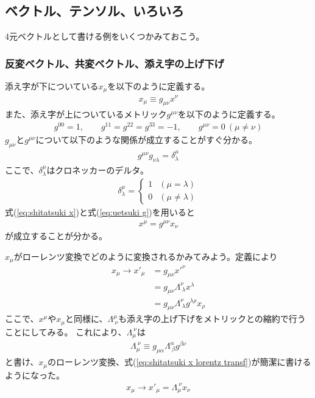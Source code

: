 \documentclass[10pt,a4paper]{jarticle}
\begin{document}
\subsection{ベクトル、テンソル、いろいろ}
4元ベクトルとして書ける例をいくつかみておこう。

\subsubsection{反変ベクトル、共変ベクトル、添え字の上げ下げ}
添え字が下についている$x_\mu$を以下のように定義する。
\begin{align}
x_\mu \equiv g_{\mu\nu} x^\nu \label{eq:shitatsuki x}
\end{align}
また、添え字が上についているメトリック$g^{\mu\nu}$を以下のように定義する。
\begin{align}
g^{00} = 1, \qquad
g^{11} = 
g^{22} = 
g^{33} = -1, \qquad
g^{\mu\nu} = 0~(\mu\neq\nu) \label{eq:uetsuki g}
\end{align}
$g_{\mu\nu}$と$g^{\mu\nu}$について以下のような関係が成立することがすぐ分かる。
\begin{align}
g^{\mu\nu} g_{\nu\lambda} = \delta^\mu_\lambda
\end{align}
ここで、$\delta^\mu_\lambda$はクロネッカーのデルタ。
\begin{align}
\delta^\mu_\lambda = \begin{cases}
1 & (\mu = \lambda) \\
0 & (\mu \neq \lambda)
\end{cases}
\end{align}
式(\ref{eq:shitatsuki x})と式(\ref{eq:uetsuki g})を用いると
\begin{align}
x^\mu = g^{\mu\nu} x_\nu
\end{align}
が成立することが分かる。

$x_\mu$がローレンツ変換でどのように変換されるかみてみよう。定義により
\begin{align}
x_{\mu} \to x'_\mu
&= g_{\mu\nu} x'^\nu \nonumber\\
&= g_{\mu\nu} \Lambda^\nu_{~\lambda} x^\lambda \nonumber\\
&= g_{\mu\nu} \Lambda^\nu_{~\lambda} g^{\lambda\rho} x_\rho \label{eq:shitatsuki x lorentz transf}
\end{align}
%
ここで、$x^\mu$や$x_\mu$と同様に、$\Lambda^\mu_{~\nu}$も添え字の上げ下げをメトリックとの縮約で行うことにしてみる。
これにより、$\Lambda_{\mu}^{~\nu}$は
\begin{align}
\Lambda_\mu^{~\nu} \equiv g_{\mu\alpha} \Lambda^\alpha_{~\beta} g^{\beta\nu}
\end{align}
と書け、$x_\mu$のローレンツ変換、式(\ref{eq:shitatsuki x lorentz transf})が簡潔に書けるようになった。
\begin{align}
x_\mu \to x'_\mu = \Lambda_\mu^{~\nu} x_\nu
\end{align}
\end{document}
